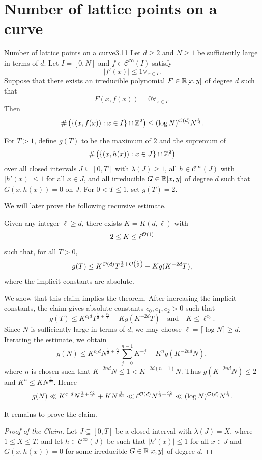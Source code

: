 \documentclass{Vorlesungstemplate_English} %
\begin{document}
\section{Number of lattice points on a curve}
\begin{theorem}{Number of lattice points on a curve}{3.11}
  Let $d \geq 2$ and $N \geq 1$ be sufficiently large in terms of $d$. Let $I = [0,N]$ and $f \in \mathcal{C}^{\infty}(I)$ satisfy
  \[ |f'(x)| \leq 1 \forall_{x \in I}.\]
  Suppose that there exists an irreducible polynomial $F \in \mathbb{R}[x,y]$ of degree $d$ such that
  \[ F(x,f(x)) = 0 \forall_{x \in I}.\]
  Then
  \[ \#\left(\{(x,f(x)): x \in I\}\cap \mathbb{Z}^2\right) \leq (\log N)^{\mathcal{O}(d)}N^{\frac{1}{d}}.\]
\end{theorem}
\begin{pf}
  For $T > 1$, define $g(T)$ to be the maximum of $2$ and the supremum of
  \[ \#\left(\{(x,h(x)): x \in J\}\cap\mathbb{Z}^2\right)\]
  over all closed intervals $J \subseteq [0,T]$ with $\lambda(J) \geq 1$, all $h \in \mathcal{C}^{\infty}(J)$ with $|h'(x)| \leq 1$ for all $x \in J$, and all irreducible $G \in \mathbb{R}[x,y]$ of degree $d$ such that $G(x,h(x))=0$ on $J$. For $0 < T \leq 1$, set $g(T)=2$.

  We will later prove the following recursive estimate.
  \begin{claim}{}{}
    Given any integer $\ell \geq d$, there exists $K = K(d,\ell)$ with
    \[ 2 \leq K \leq \ell^{\mathcal{O}(1)}\]
    such that, for all $T > 0$,
    \[ g(T) \leq K^{\mathcal{O}(d)}T^{\frac{1}{d}+\mathcal{O}\left(\frac{1}{\ell}\right)} + K g(K^{-2d}T),\]
    where the implicit constants are absolute.
  \end{claim}

  We show that this claim implies the theorem. After increasing the implicit constants, the claim gives absolute constants $c_0,c_1,c_2>0$ such that
  \[ g(T) \leq K^{c_1d}T^{\frac{1}{d}+\frac{c_2}{\ell}} + Kg(K^{-2d}T) \quad \text{and} \quad K \leq \ell^{c_0}.\]
  Since $N$ is sufficiently large in terms of $d$, we may choose $\ell = \lceil \log N\rceil \geq d$. Iterating the estimate, we obtain
  \[ g(N) \leq K^{c_1d}N^{\frac{1}{d}+\frac{c_2}{\ell}}\sum_{j=0}^{n-1}K^{-j} + K^ng(K^{-2nd}N),\]
  where $n$ is chosen such that $K^{-2nd}N \leq 1 < K^{-2d(n-1)}N$. Thus $g(K^{-2nd}N) \leq 2$ and $K^n \leq KN^{\frac{1}{2d}}$. Hence
  \[ g(N) \ll K^{c_1d}N^{\frac{1}{d}+\frac{c_2}{\ell}} + KN^{\frac{1}{2d}} \ll \ell^{\mathcal{O}(d)}N^{\frac{1}{d}+\frac{c_2}{\ell}} \ll (\log N)^{\mathcal{O}(d)}N^{\frac{1}{d}}.\]

  It remains to prove the claim.
    \begin{proof}[Proof of the Claim]
    Let $J \subseteq [0,T]$ be a closed interval with $\lambda(J)=X$, where $1 \leq X \leq T$, and let $h \in \mathcal{C}^{\infty}(J)$ be such that $|h'(x)| \leq 1$ for all $x \in J$ and $G(x,h(x))=0$ for some irreducible $G \in \mathbb{R}[x,y]$ of degree $d$.


\end{proof}
\end{pf}
\end{document}
